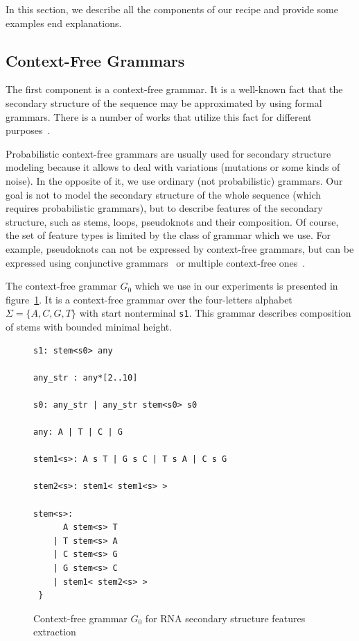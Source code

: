\documentclass[a4paper,twoside]{article}
\begin{document}
In this section, we describe all the components of our recipe and provide some examples end explanations.
 
\subsection{Context-Free Grammars}

\noindent The first component is a context-free grammar. 
It is a well-known fact that the secondary structure of the sequence may be approximated by using formal grammars.
There is a number of works that utilize this fact for different purposes~\cite{GrammarsRNA,LWPCFG,zier2013rna,knudsen2003pfold}.

Probabilistic context-free grammars are usually used for secondary structure modeling because it allows to deal with variations (mutations or some kinds of noise).
In the opposite of it, we use ordinary (not probabilistic) grammars.
Our goal is not to model the secondary structure of the whole sequence (which requires probabilistic grammars), but to describe features of the secondary structure, such as stems, loops, pseudoknots and their composition.
Of course, the set of feature types is limited by the class of grammar which we use.
For example, pseudoknots can not be expressed by context-free grammars, but can be expressed using conjunctive grammars~\cite{KanchanDevi2017,zier2013rna,Okhotin:2001:CG:543313.543323} or multiple context-free ones~\cite{SEKI1991191,Riechert:2016:ADP:2972703.2972851}.

The context-free grammar $G_0$ which we use in our experiments is presented in figure~\ref{fig:cfg-rna}.
It is a context-free grammar over the four-letters alphabet $\Sigma=\{A,C,G,T\}$ with start nonterminal \verb|s1|.
This grammar describes composition of stems with bounded minimal height.

\begin{figure}
\begin{verbatim}
s1: stem<s0> any

any_str : any*[2..10]

s0: any_str | any_str stem<s0> s0

any: A | T | C | G

stem1<s>: A s T | G s C | T s A | C s G 

stem2<s>: stem1< stem1<s> >

stem<s>:  
      A stem<s> T 
    | T stem<s> A 
    | C stem<s> G 
    | G stem<s> C 
    | stem1< stem2<s> >  
 } 
\end{verbatim}
\caption{Context-free grammar $G_0$ for RNA secondary structure features extraction}
\label{fig:cfg-rna}
\end{figure}
\end{document}
